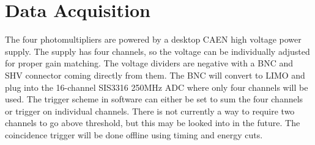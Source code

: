 \documentclass[]{article}
\begin{document}
\section{Data Acquisition}
The four photomultipliers are powered by a desktop CAEN high voltage power supply. The supply
has four channels, so the voltage can be individually adjusted for proper gain matching. The
voltage dividers are negative with a BNC and SHV connector coming directly from them. The BNC
will convert to LIMO and plug into the 16-channel SIS3316 250MHz ADC where only four channels
will be used. The trigger scheme in software can either be set to sum the four channels or
trigger on individual channels. There is not currently a way to require two channels to go
above threshold, but this may be looked into in the future. The coincidence trigger will be
done offline using timing and energy cuts.
\end{document}
